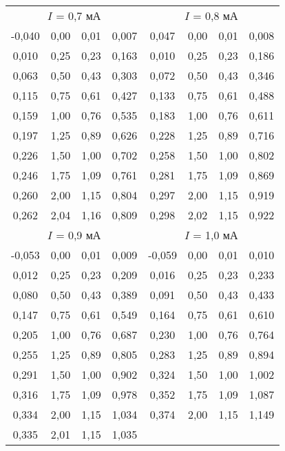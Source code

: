 \begin{tabular}{cccc|cccc}
  \multicolumn{4}{c}{$I$ = 0,7 мА} & \multicolumn{4}{c}{$I$ = 0,8 мА}\\
  
 -0,040	&0,00	&0,01	&0,007	&0,047	&0,00	&0,01	&0,008	\\
 0,010	&0,25	&0,23	&0,163	&0,010	&0,25	&0,23	&0,186	\\
 0,063	&0,50	&0,43	&0,303	&0,072	&0,50	&0,43	&0,346	\\
 0,115	&0,75	&0,61	&0,427	&0,133	&0,75	&0,61	&0,488	\\
 0,159	&1,00	&0,76	&0,535	&0,183	&1,00	&0,76	&0,611	\\
 0,197	&1,25	&0,89	&0,626	&0,228	&1,25	&0,89	&0,716	\\
 0,226	&1,50	&1,00	&0,702	&0,258	&1,50	&1,00	&0,802	\\
 0,246	&1,75	&1,09	&0,761	&0,281	&1,75	&1,09	&0,869	\\
 0,260	&2,00	&1,15	&0,804	&0,297	&2,00	&1,15	&0,919	\\
 0,262	&2,04	&1,16	&0,809	&0,298	&2,02	&1,15	&0,922	\\
 
 \multicolumn{4}{c}{$I$ = 0,9 мА} & \multicolumn{4}{c}{$I$ = 1,0 мА}\\
 
 -0,053 &0,00	&0,01	&0,009	&-0,059 &0,00 &0,01 &0,010\\
 0,012 &0,25	&0,23	&0,209	& 0,016 &0,25 &0,23 &0,233\\
 0,080 &0,50	&0,43	&0,389	& 0,091 &0,50 &0,43 &0,433\\
 0,147 &0,75	&0,61	&0,549	& 0,164 &0,75 &0,61 &0,610\\
 0,205 &1,00	&0,76	&0,687	& 0,230 &1,00 &0,76 &0,764\\
 0,255 &1,25	&0,89	&0,805	& 0,283 &1,25 &0,89 &0,894\\
 0,291 &1,50	&1,00	&0,902	& 0,324 &1,50 &1,00 &1,002\\
 0,316 &1,75	&1,09	&0,978	& 0,352 &1,75 &1,09 &1,087\\
 0,334 &2,00	&1,15	&1,034	& 0,374 &2,00 &1,15 &1,149\\
 0,335 &2,01	&1,15	&1,035	&       &     &     &     \\
 
\bottomrule
\end{tabular}

